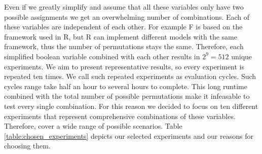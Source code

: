 Even if we greatly simplify and assume that all these variables only have two possible assignments we get an overwhelming number of combinations.
Each of these variables are independent of each other.
For example F is based on the framework used in R, but R can implement different models with the same framework, thus the number of permutations stays the same.
Therefore, each simplified boolean variable combined with each other results in $ 2^9 = 512$ unique experiments.
We aim to present representative results, so every experiment is repeated ten times.
We call such repeated experiments as evaluation cycles.
Such cycles range take half an hour to several hours to complete.
This long runtime combined with the total number of possible permutations make it infeasable to test every single combination.
For this reason we decided to focus on ten different experiments that represent comprehensive combinations of these variables.
Therefore, cover a wide range of possible scenarios.
Table \ref{table:chosen_experiments} depicts our selected experiments and our reasons for choosing them.


\begin{figure}[p]
    
\end{figure}

